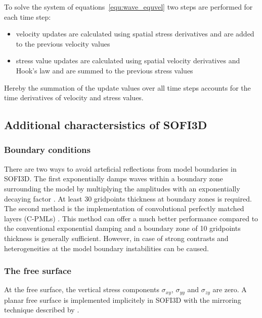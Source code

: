 To solve the system of equations~\ref{equ:wave_equvel} two steps are performed for each time step: 
\begin{itemize}
 \item velocity updates are calculated using spatial stress derivatives and are added to the previous velocity values
\item stress value updates are calculated using spatial velocity derivatives and Hook's law and are summed to the previous stress values
\end{itemize}
Hereby the summation of the update values over all time steps accounts for the time derivatives of velocity and stress values. 
\subsection{Additional charactersistics of SOFI3D}\label{sec:SOFI3Dcharacter}
\subsubsection*{Boundary conditions}
There are two ways to avoid arteficial reflections from model boundaries in SOFI3D. The first exponentially damps waves within a boundary zone surrounding the model by multiplying the amplitudes with an exponentially decaying factor \citep{Cer85}. At least 30 gridpoints thickness at boundary zones is required. The second method is the implementation of convolutional perfectly matched layers (C-PMLs) \citep{Ber94,Kom07}. This method can offer a much better performance compared to the  conventional exponential damping and a boundary zone of 10 gridpoints thickness is generally sufficient. However, in case of strong contrasts and heterogeneities at the model boundary instabilities can be caused.
\subsubsection*{The free surface}
At the free surface, the vertical stress components $\sigma_{xy}$, $\sigma_{yy}$ and  $\sigma_{zy}$ are zero. A planar free surface is implemented implicitely in SOFI3D with the mirroring technique described by \cite{Lev88}.
